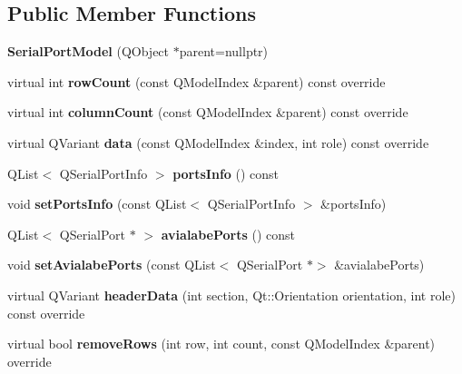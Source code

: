 \subsection*{Public Member Functions}
\begin{DoxyCompactItemize}
\item 
\mbox{\label{class_serial_port_model_ab74ab55a8ca5a6255240701466ba534a}} 
{\bfseries Serial\+Port\+Model} (Q\+Object $\ast$parent=nullptr)
\item 
\mbox{\label{class_serial_port_model_ad61015517918391e750673b2d0a2743f}} 
virtual int {\bfseries row\+Count} (const Q\+Model\+Index \&parent) const override
\item 
\mbox{\label{class_serial_port_model_ad0460ff6a97ffe21fca772327f6440f3}} 
virtual int {\bfseries column\+Count} (const Q\+Model\+Index \&parent) const override
\item 
\mbox{\label{class_serial_port_model_abf2e5036c85fea58eea037c7fcd1294f}} 
virtual Q\+Variant {\bfseries data} (const Q\+Model\+Index \&index, int role) const override
\item 
\mbox{\label{class_serial_port_model_aca796b65decbcbea757db4478e015559}} 
Q\+List$<$ Q\+Serial\+Port\+Info $>$ {\bfseries ports\+Info} () const
\item 
\mbox{\label{class_serial_port_model_a9357641fbf3a53f7ab97a3624656d0e7}} 
void {\bfseries set\+Ports\+Info} (const Q\+List$<$ Q\+Serial\+Port\+Info $>$ \&ports\+Info)
\item 
\mbox{\label{class_serial_port_model_ae17bdaa1d13f60f60da0d4218cae0fbb}} 
Q\+List$<$ Q\+Serial\+Port $\ast$ $>$ {\bfseries avialabe\+Ports} () const
\item 
\mbox{\label{class_serial_port_model_ac8678f219e4a380a8de05f556e48f47c}} 
void {\bfseries set\+Avialabe\+Ports} (const Q\+List$<$ Q\+Serial\+Port $\ast$$>$ \&avialabe\+Ports)
\item 
\mbox{\label{class_serial_port_model_adebd2b1a062707e998b85e97f30ede95}} 
virtual Q\+Variant {\bfseries header\+Data} (int section, Qt\+::\+Orientation orientation, int role) const override
\item 
\mbox{\label{class_serial_port_model_aa12f773f0b7f7e1bbd5e1110f559f366}} 
virtual bool {\bfseries remove\+Rows} (int row, int count, const Q\+Model\+Index \&parent) override
\end{DoxyCompactItemize}


